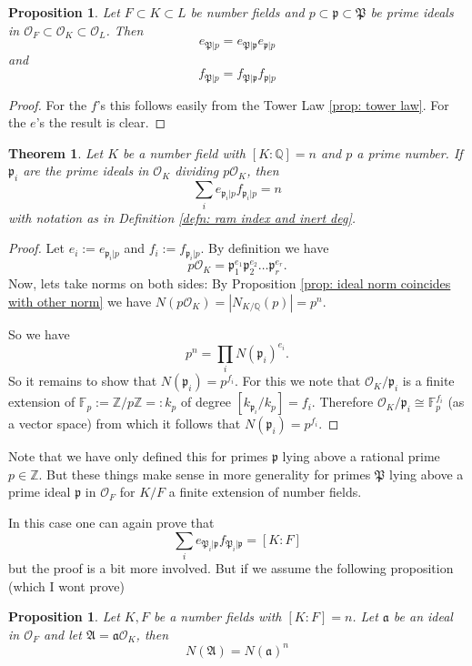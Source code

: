 \documentclass[11pt,a4paper]{report}
\theoremstyle{plain}
\newtheorem{thm}[subsection]{Theorem}
\newtheorem{prop}[subsection]{Proposition}
\theoremstyle{definition}
\theoremstyle{definition}
\newcommand{\ZZ}{\mathbb{Z}}
\def\FF{\mathbb{F}}
\def\QQ{\mathbb{Q}}
\def \gothP{\mathfrak{P}}
\def\gothp{\mathfrak{p}}
\def \OO {\mathcal{O}}
\def\gotha{\mathfrak{a}}
\begin{document}
	\begin{prop}\label{prop: tow law for ram rel}
		Let $F \subset K \subset L$ be number fields and $p \subset \gothp \subset \gothP$ be prime ideals in $\OO_F \subset \OO_K \subset \OO_L$. Then
		\[e_{\gothP|p}=e_{\gothP|\gothp}e_{\gothp|p} \] and 	\[f_{\gothP|p}=f_{\gothP|\gothp}f_{\gothp|p} \]
	\end{prop}
	
	\begin{proof}
		For the $f$'s this follows easily from the Tower Law \ref{prop: tower law}. For the $e$'s the result is clear.
	\end{proof}
	
	\begin{thm}\label{thm: ram-rel}
		Let $K$ be a number field with $[K:\QQ]=n$ and $p$ a prime number. If $\gothp_i$ are the prime ideals in $\OO_K$ dividing $p\OO_K$, then \[\sum_i e_{\gothp_i|p}f_{\gothp_i|p}=n\] with notation as in Definition \ref{defn: ram index and inert deg}.
	\end{thm}
	
	\begin{proof}
		Let $e_i:=e_{\gothp_i|p}$ and $f_i:=f_{\gothp_i|p}$. By definition we have \[p\OO_K=\gothp_1^{e_1}\gothp_2^{e_2}\dots\gothp_r^{e_r}.\] Now, lets take norms on both sides: By Proposition \ref{prop: ideal norm coincides with other norm} we have $N(p\OO_K)=|N_{K/\QQ}(p)|=p^n$.
		
		So we have  \[p^n=\prod_i N(\gothp_i)^{e_i}.\] So it remains to show that $N(\gothp_i)=p^{f_i}$. For this we note that $\OO_K/\gothp_i$ is a finite extension of $\FF_p:=\ZZ/p\ZZ=:k_p$ of degree $[k_{\gothp_i}/k_p]=f_i$. Therefore $\OO_K/\gothp_i \cong \FF_p^{f_i}$ (as a vector space) from which it follows that  $N(\gothp_i)=p^{f_i}$. 
	\end{proof}
	
	
	
	
	
	
	Note that we have only defined this for primes $\gothp$ lying above a rational prime $p \in \ZZ$. But these things make sense in more generality for primes $\gothP$  lying above a prime ideal $\gothp$ in $\OO_F$ for $K/F$ a finite extension of number fields. 
	
	In this case one can again prove that \begin{equation} \label{eqn: ram rel} \sum_i e_{\gothP_i|\gothp}f_{\gothP_i|\gothp}=[K:F] \end{equation} but the proof is a bit more involved. But if we assume the following proposition (which I wont prove)	
	\begin{prop}\label{prop: ideal norm in tower}
		Let $K,F$ be a number fields with $[K:F]=n$. Let $\mathfrak{a}$ be an ideal in $\OO_F$ and let $\mathfrak{A}=\gotha\OO_K$, then 
		\[N(\mathfrak{A})=N(\gotha)^n\]
	\end{prop}
	
\end{document}
